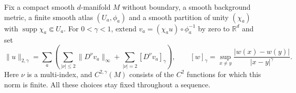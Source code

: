 Fix a compact smooth $d$-manifold $M$ without boundary, a smooth background metric,
a finite smooth atlas $(U_a,\phi_a)$ and a smooth partition of unity $(\chi_a)$
with $\operatorname{supp}\chi_a\Subset U_a$.
For $0<\gamma<1$, extend $v_a=(\chi_a u)\circ\phi_a^{-1}$ by zero to $\mathbb R^d$ and set
\[
 \|u\|_{2,\gamma}=\sum_a\left(\sum_{|\nu|\leq2}\|D^\nu v_a\|_\infty
       +\sum_{|\nu|=2}[D^\nu v_a]_\gamma\right),
 \qquad [w]_\gamma=\sup_{x\ne y}\frac{|w(x)-w(y)|}{|x-y|^\gamma}.
\]
Here $\nu$ is a multi-index, and $C^{2,\gamma}(M)$ consists of the $C^2$ functions
for which this norm is finite. All these choices stay fixed throughout a sequence.